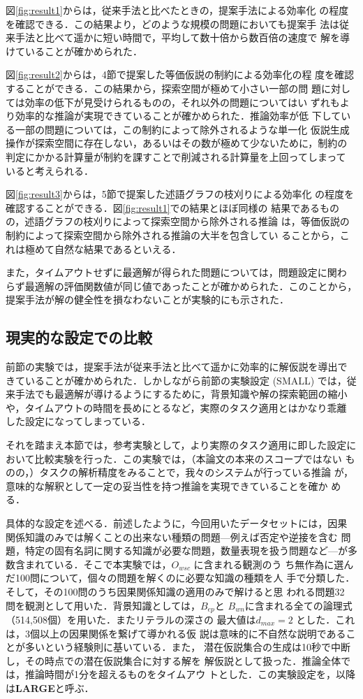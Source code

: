 \documentclass[japanese]{jnlp_1.4}
\begin{document}
図\ref{fig:result1}からは，従来手法と比べたときの，提案手法による効率化
の程度を確認できる．この結果より，どのような規模の問題においても提案手
法は従来手法と比べて遥かに短い時間で，平均して数十倍から数百倍の速度で
解を導けていることが確かめられた．

図\ref{fig:result2}からは，4節で提案した等価仮説の制約による効率化の程
度を確認することができる．この結果から，探索空間が極めて小さい一部の問
題に対しては効率の低下が見受けられるものの，それ以外の問題についてはい
ずれもより効率的な推論が実現できていることが確かめられた．推論効率が低
下している一部の問題については，この制約によって除外されるような単一化
仮説生成操作が探索空間に存在しない，あるいはその数が極めて少ないために，制約の
判定にかかる計算量が制約を課すことで削減される計算量を上回ってしまって
いると考えられる．

図\ref{fig:result3}からは，5節で提案した述語グラフの枝刈りによる効率化
の程度を確認することができる．図\ref{fig:result1}での結果とほぼ同様の
結果であるものの，述語グラフの枝刈りによって探索空間から除外される推論
は，等価仮説の制約によって探索空間から除外される推論の大半を包含してい
ることから，これは極めて自然な結果であるといえる．

また，タイムアウトせずに最適解が得られた問題については，問題設定に関わ
らず最適解の評価関数値が同じ値であったことが確かめられた．このことから，
提案手法が解の健全性を損なわないことが実験的にも示された．


\subsection{現実的な設定での比較}

前節の実験では，提案手法が従来手法と比べて遥かに効率的に解仮説を導出で
きていることが確かめられた．しかしながら前節の実験設定 (SMALL) では，従
来手法でも最適解が導けるようにするために，背景知識や解の探索範囲の縮小
や，タイムアウトの時間を長めにとるなど，実際のタスク適用とはかなり乖離
した設定になってしまっている．

それを踏まえ本節では，参考実験として，より実際のタスク適用に即した設定に
おいて比較実験を行った．この実験では，（本論文の本来のスコープではない
ものの，）タスクの解析精度をみることで，我々のシステムが行っている推論
が，意味的な解釈として一定の妥当性を持つ推論を実現できていることを確か
める．

具体的な設定を述べる．前述したように，今回用いたデータセットには，因果
関係知識のみでは解くことの出来ない種類の問題—例えば否定や逆接を含む
問題，特定の固有名詞に関する知識が必要な問題，数量表現を扱う問題など—が多数含まれている．そこで本実験では，$O_\mathit{wsc}$ に含まれる観測のう
ち無作為に選んだ100問について，個々の問題を解くのに必要な知識の種類を人
手で分類した．そして，その100問のうち因果関係知識の適用のみで解けると思
われる問題32 問を観測として用いた．背景知識としては，$B_\mathit{ep}$と
$B_\mathit{wn}$に含まれる全ての論理式（514,508個）を用いた．またリテラルの深さの
最大値は$d_\mathit{max}=2$ とした．これは，3個以上の因果関係を繋げて導かれる仮
説は意味的に不自然な説明であることが多いという経験則に基いている．また，
潜在仮説集合の生成は10秒で中断し，その時点での潜在仮説集合に対する解を
解仮説として扱った．推論全体では，推論時間が1分を超えるものをタイムアウ
トとした．この実験設定を，以降は{\bf LARGE}と呼ぶ．
\end{document}
